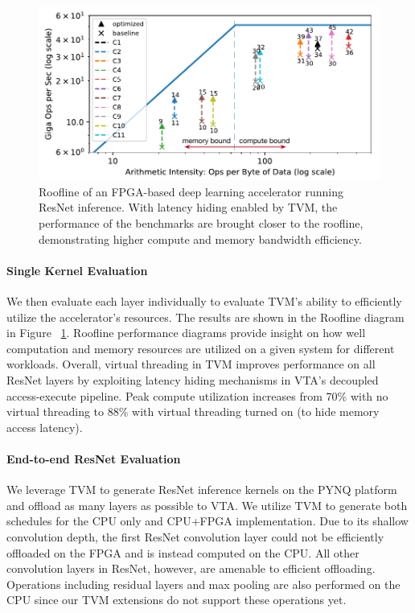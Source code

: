 \documentclass[sigconf]{acmart}
\begin{document}
\begin{figure}[!t]
\centering
\includegraphics[width=0.9\columnwidth]{figures/vta_roofline}
\caption{\small{Roofline of an FPGA-based deep learning accelerator running ResNet inference. With latency hiding enabled by TVM, the performance of the benchmarks are brought closer to the roofline, demonstrating higher compute and memory bandwidth efficiency.}}
\label{fig:fpga_latencyhiding}
\end{figure}

\paragraph{Single Kernel Evaluation}
We then evaluate each layer individually to evaluate TVM's ability to efficiently utilize the accelerator's resources.
The results are shown in the Roofline diagram in Figure ~\ref{fig:fpga_latencyhiding}.
Roofline performance diagrams provide insight on how well computation and memory resources are utilized on a given system for different workloads.
Overall, virtual threading in TVM improves performance on all ResNet layers by exploiting latency hiding mechanisms in VTA's decoupled access-execute pipeline.
Peak compute utilization increases from 70\% with no virtual threading to 88\% with virtual threading turned on (to hide memory access latency).

\paragraph{End-to-end ResNet Evaluation}
We leverage TVM to generate ResNet inference kernels on the PYNQ platform and offload as many layers as possible to VTA.
We utilize TVM to generate both schedules for the CPU only and CPU+FPGA implementation.
Due to its shallow convolution depth, the first ResNet convolution layer could not be efficiently offloaded on the FPGA and is instead computed on the CPU.
All other convolution layers in ResNet, however, are amenable to efficient offloading.
Operations including residual layers and max pooling are also performed on the CPU since our TVM extensions do not support these operations yet.
\end{document}
